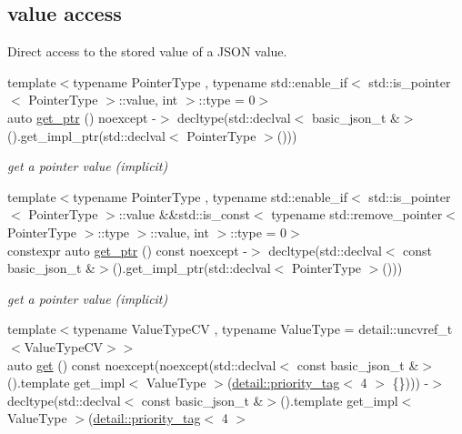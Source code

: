 \subsection*{value access}
\label{_amgrpd8f53c9caf18314e5b3f758245606995}%
Direct access to the stored value of a J\+S\+ON value. \begin{DoxyCompactItemize}
\item 
{\footnotesize template$<$typename Pointer\+Type , typename std\+::enable\+\_\+if$<$ std\+::is\+\_\+pointer$<$ Pointer\+Type $>$\+::value, int $>$\+::type  = 0$>$ }\\auto \hyperlink{classnlohmann_1_1basic__json_ac3698ce827dcd4f0c81455461709938d}{get\+\_\+ptr} () noexcept -\/$>$ decltype(std\+::declval$<$ basic\+\_\+json\+\_\+t \&$>$().get\+\_\+impl\+\_\+ptr(std\+::declval$<$ Pointer\+Type $>$()))
\begin{DoxyCompactList}\small\item\em get a pointer value (implicit) \end{DoxyCompactList}\item 
{\footnotesize template$<$typename Pointer\+Type , typename std\+::enable\+\_\+if$<$ std\+::is\+\_\+pointer$<$ Pointer\+Type $>$\+::value \&\&std\+::is\+\_\+const$<$ typename std\+::remove\+\_\+pointer$<$ Pointer\+Type $>$\+::type $>$\+::value, int $>$\+::type  = 0$>$ }\\constexpr auto \hyperlink{classnlohmann_1_1basic__json_ae4e9a0afab117f1642b90b9607285348}{get\+\_\+ptr} () const noexcept -\/$>$ decltype(std\+::declval$<$ const basic\+\_\+json\+\_\+t \&$>$().get\+\_\+impl\+\_\+ptr(std\+::declval$<$ Pointer\+Type $>$()))
\begin{DoxyCompactList}\small\item\em get a pointer value (implicit) \end{DoxyCompactList}\item 
{\footnotesize template$<$typename Value\+Type\+CV , typename Value\+Type  = detail\+::uncvref\+\_\+t$<$\+Value\+Type\+C\+V$>$$>$ }\\auto \hyperlink{classnlohmann_1_1basic__json_ad8c8d2d107c6952960ba8aa78e009284}{get} () const noexcept(noexcept(std\+::declval$<$ const basic\+\_\+json\+\_\+t \&$>$().template get\+\_\+impl$<$ Value\+Type $>$(\hyperlink{structnlohmann_1_1detail_1_1priority__tag}{detail\+::priority\+\_\+tag}$<$ 4 $>$ \{\}))) -\/$>$ decltype(std\+::declval$<$ const basic\+\_\+json\+\_\+t \&$>$().template get\+\_\+impl$<$ Value\+Type $>$(\hyperlink{structnlohmann_1_1detail_1_1priority__tag}{detail\+::priority\+\_\+tag}$<$ 4 $>$

\end{DoxyCompactItemize}
